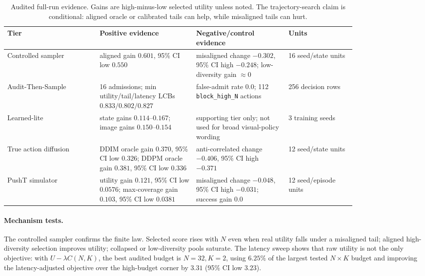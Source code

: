 \documentclass{article}
\newcommand{\ats}{Audit-Then-Sample}
\newcommand{\ci}{95\% CI}
\newcommand{\lcb}{LCB}
\begin{document}
\begin{table}[t]
\caption{Audited full-run evidence. Gains are high-minus-low selected utility unless noted. The trajectory-search claim is conditional: aligned oracle or calibrated tails can help, while misaligned tails can hurt.}
\label{tab:main-evidence}
\centering
\small
\begin{tabular}{@{}p{0.22\linewidth}p{0.23\linewidth}p{0.22\linewidth}p{0.16\linewidth}@{}}
\toprule
Tier & Positive evidence & Negative/control evidence & Units \\
\midrule
Controlled sampler & aligned gain $0.601$, \ci{} low $0.550$ & misaligned change $-0.302$, \ci{} high $-0.248$; low-diversity gain $\approx 0$ & 16 seed/state units \\
\ats{} & 16 admissions; min utility/tail/latency \lcb{}s $0.833/0.802/0.827$ & false-admit rate $0.0$; 112 \texttt{block\_high\_N} actions & 256 decision rows \\
Learned-lite & state gains $0.114$--$0.167$; image gains $0.150$--$0.154$ & supporting tier only; not used for broad visual-policy wording & 3 training seeds \\
True action diffusion & DDIM oracle gain $0.370$, \ci{} low $0.326$; DDPM oracle gain $0.381$, \ci{} low $0.336$ & anti-correlated change $-0.406$, \ci{} high $-0.371$ & 12 seed/state units \\
PushT simulator & utility gain $0.121$, \ci{} low $0.0576$; max-coverage gain $0.103$, \ci{} low $0.0381$ & misaligned change $-0.048$, \ci{} high $-0.031$; success gain $0.0$ & 12 seed/episode units \\
\bottomrule
\end{tabular}
\end{table}

\paragraph{Mechanism tests.}
The controlled sampler confirms the finite law. Selected score rises with $N$ even when real utility falls under a misaligned tail; aligned high-diversity selection improves utility; collapsed or low-diversity pools saturate. The latency sweep shows that raw utility is not the only objective: with $U-\lambda C(N,K)$, the best audited budget is $N=32,K=2$, using $6.25\%$ of the largest tested $N{\times}K$ budget and improving the latency-adjusted objective over the high-budget corner by $3.31$ (\ci{} low $3.23$).
\end{document}
